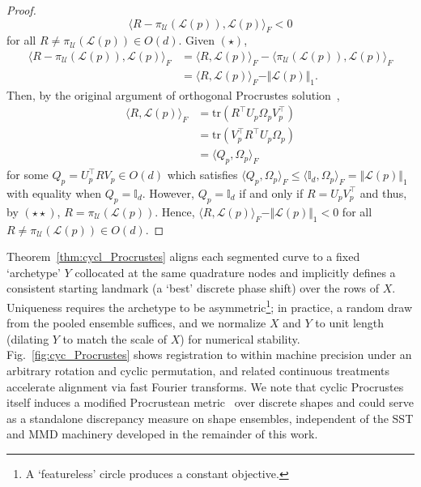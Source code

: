 \documentclass[pdflatex,iicol]{sn-jnl}%
\theoremstyle{thmstyleone}%
\theoremstyle{thmstyletwo}%
\theoremstyle{thmstylethree}%
\begin{document}
\begin{proof}
    $$\langle R - \pi_{\mathcal{U}}(\mathcal{L}(p)), \mathcal{L}(p) \rangle_F<0
    $$ 
    for all $R \neq \pi_{\mathcal{U}}(\mathcal{L}(p)) \in O(d)$. Given $(\star)$,
    \begin{align*}
        \langle R - \pi_{\mathcal{U}}(\mathcal{L}(p)),\mathcal{L}(p)\rangle_F &= \langle R,\mathcal{L}(p)\rangle_F - \langle \pi_{\mathcal{U}}(\mathcal{L}(p)), \mathcal{L}(p)\rangle_F \\
        &= \langle R,\mathcal{L}(p)\rangle_F - \Vert \mathcal{L}(p) \Vert_1.
    \end{align*}
    Then, by the original argument of orthogonal Procrustes solution~\cite{gibson1962least, schonemann1966generalized, lawrence2019purely}, 
    \begin{align*}
        \langle R,\mathcal{L}(p)\rangle_F &= \text{tr}(R^{\top}U_p\Omega_pV_p^{\top}) \\
        &= \text{tr}(V_p^{\top}R^{\top}U_p\Omega_p) \\
        &= \langle Q_p, \Omega_p\rangle_F
    \end{align*}
    for some $Q_p =  U_p^{\top}RV_p \in O(d)$ which satisfies $\langle Q_p, \Omega_p\rangle_F \leq \langle \mathbb{I}_d, \Omega_p\rangle_F = \Vert \mathcal{L}(p) \Vert_1$ with equality when $Q_p = \mathbb{I}_d$. However, $Q_p = \mathbb{I}_d$ if and only if $R = U_pV_p^{\top}$ and thus, by $(\star\star)$, $R = \pi_{\mathcal{U}}(\mathcal{L}(p))$. Hence, $\langle R,\mathcal{L}(p)\rangle_F - \Vert \mathcal{L}(p) \Vert_1 < 0$ for all $R \neq \pi_{\mathcal{U}}(\mathcal{L}(p)) \in O(d)$.
\end{proof}

Theorem~\ref{thm:cycl_Procrustes} aligns each segmented curve to a fixed `archetype' $Y$ collocated at the same quadrature nodes and implicitly defines a consistent starting landmark (a `best' discrete phase shift) over the rows of $X$. Uniqueness requires the archetype to be asymmetric\footnote{A `featureless' circle produces a constant objective.}; in practice, a random draw from the pooled ensemble suffices, and we normalize $X$ and $Y$ to unit length (dilating $Y$ to match the scale of $X$) for numerical stability. Fig.~\ref{fig:cyc_Procrustes} shows registration to within machine precision under an arbitrary rotation and cyclic permutation, and related continuous treatments~\cite{dogan2015fast} accelerate alignment via fast Fourier transforms. We note that cyclic Procrustes itself induces a modified Procrustean metric~\cite{srivastava2016functional} over discrete shapes and could serve as a standalone discrepancy measure on shape ensembles, independent of the SST and MMD machinery developed in the remainder of this work.
\end{document}
